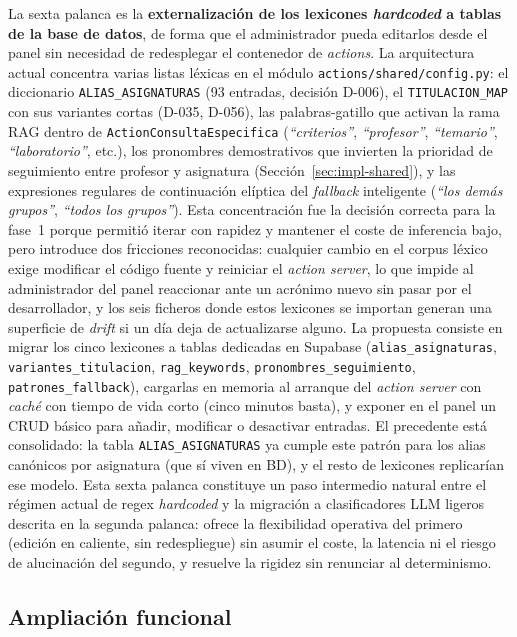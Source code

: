La sexta palanca es la \textbf{externalización de los lexicones \textit{hardcoded} a tablas de la base de datos}, de forma que el administrador pueda editarlos desde el panel sin necesidad de redesplegar el contenedor de \textit{actions}. La arquitectura actual concentra varias listas léxicas en el módulo \texttt{actions/shared/config.py}: el diccionario \texttt{ALIAS\_ASIGNATURAS} (93 entradas, decisión D-006), el \texttt{TITULACION\_MAP} con sus variantes cortas (D-035, D-056), las palabras-gatillo que activan la rama RAG dentro de \texttt{ActionConsultaEspecifica} (\textit{``criterios''}, \textit{``profesor''}, \textit{``temario''}, \textit{``laboratorio''}, etc.), los pronombres demostrativos que invierten la prioridad de seguimiento entre profesor y asignatura (Sección~\ref{sec:impl-shared}), y las expresiones regulares de continuación elíptica del \textit{fallback} inteligente (\textit{``los demás grupos''}, \textit{``todos los grupos''}). Esta concentración fue la decisión correcta para la fase~1 porque permitió iterar con rapidez y mantener el coste de inferencia bajo, pero introduce dos fricciones reconocidas: cualquier cambio en el corpus léxico exige modificar el código fuente y reiniciar el \textit{action server}, lo que impide al administrador del panel reaccionar ante un acrónimo nuevo sin pasar por el desarrollador, y los seis ficheros donde estos lexicones se importan generan una superficie de \textit{drift} si un día deja de actualizarse alguno. La propuesta consiste en migrar los cinco lexicones a tablas dedicadas en Supabase (\texttt{alias\_asignaturas}, \texttt{variantes\_titulacion}, \texttt{rag\_keywords}, \texttt{pronombres\_seguimiento}, \texttt{patrones\_fallback}), cargarlas en memoria al arranque del \textit{action server} con \textit{caché} con tiempo de vida corto (cinco minutos basta), y exponer en el panel un CRUD básico para añadir, modificar o desactivar entradas. El precedente está consolidado: la tabla \texttt{ALIAS\_ASIGNATURAS} ya cumple este patrón para los alias canónicos por asignatura (que sí viven en BD), y el resto de lexicones replicarían ese modelo. Esta sexta palanca constituye un paso intermedio natural entre el régimen actual de regex \textit{hardcoded} y la migración a clasificadores LLM ligeros descrita en la segunda palanca: ofrece la flexibilidad operativa del primero (edición en caliente, sin redespliegue) sin asumir el coste, la latencia ni el riesgo de alucinación del segundo, y resuelve la rigidez sin renunciar al determinismo.

\subsection{Ampliación funcional}\label{subsec:conc-fut-ampliacion}

